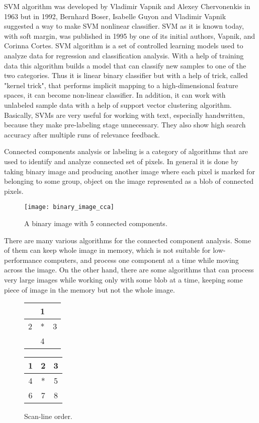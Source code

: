 \documentclass[../../../../main]{subfiles}
\begin{document}
\ac{SVM} algorithm was developed by Vladimir Vapnik and Alexey Chervonenkis in 1963 but in 1992, Bernhard Boser, Isabelle Guyon and Vladimir Vapnik suggested a way to make \ac{SVM} nonlinear classifier. \ac{SVM} as it is known today, with soft margin, was published in 1995 by one of its initial authors, Vapnik, and Corinna Cortes. \ac{SVM} algorithm is a set of controlled learning models used to analyze data for regression and classification analysis. With a help of training data this algorithm builds a model that can classify new samples to one of the two categories. Thus it is linear binary classifier but with a help of trick, called "kernel trick", that performs implicit mapping to a high-dimensional feature spaces, it can become non-linear classifier. In addition, it can work with unlabeled sample data with a help of support vector clustering algorithm. Basically, \ac{SVM}s are very useful for working with text, especially handwritten, because they make pre-labeling stage unnecessary. They also show high search accuracy after multiple runs of relevance feedback.

Connected components analysis or labeling is a category of algorithms that are used to identify and analyze connected set of pixels. In general it is done by taking binary image and producing another image where each pixel is marked for belonging to some group, object on the image represented as a blob of connected pixels. 

\begin{figure} [!ht]
  \centering    
    \texttt{[image: binary\_image\_cca]}
    \label{fig:binaryImageCca}
  \caption{A binary image with 5 connected components.}
\end{figure}

There are many various algorithms for the connected component analysis. Some of them can keep whole image in memory, which is not suitable for low-performance computers, and process one component at a time while moving across the image. On the other hand, there are some algorithms that can process very large images while working only with some blob at a time, keeping some piece of image in the memory but not the whole image.

\begin{figure} [!ht]
  \centering    
    \begin{tabular}{ |c|c|c| }
        \hline
        &1&\\
        \hline
        2& *& 3\\
        \hline
        & 4&\\
        \hline
    \end{tabular}
     \begin{tabular}{ |c|c|c| }
        \hline
        1& 2& 3\\
        \hline
        4& *& 5\\
        \hline
        6& 7& 8\\
        \hline
    \end{tabular}
    \label{fig:recursiveCcPatterns}
  \caption{Scan-line order.}
\end{figure}
\end{document}
